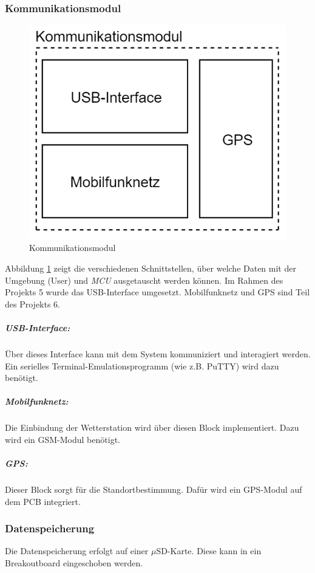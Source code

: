 \subsubsection{Kommunikationsmodul}
\begin{figure}[h]
\centering
\includegraphics[scale=0.7]{graphics/Kommunikationsmodul.PNG}
\caption{Kommunikationsmodul}
\label{fig:kommunikationsmodul}
\end{figure}
Abbildung \ref{fig:kommunikationsmodul} zeigt die verschiedenen Schnittstellen, über welche Daten mit der Umgebung (User) und \textit{MCU} ausgetauscht werden können. Im Rahmen des Projekts 5 wurde das USB-Interface umgesetzt. Mobilfunknetz und GPS sind Teil des Projekts 6.\\

\subparagraph{USB-Interface:}
Über dieses Interface kann mit dem System kommuniziert und interagiert werden. Ein serielles Terminal-Emulationsprogramm (wie z.B. PuTTY) wird dazu benötigt.\\

\subparagraph{Mobilfunknetz:}
Die Einbindung der Wetterstation wird über diesen Block implementiert. Dazu wird ein GSM-Modul benötigt.\\

\subparagraph{GPS:}
Dieser Block sorgt für die Standortbestimmung. Dafür wird ein GPS-Modul auf dem PCB integriert.\\

\subsubsection{Datenspeicherung}
Die Datenspeicherung erfolgt auf einer $\mu$SD-Karte. Diese kann in ein Breakoutboard eingeschoben werden.\\

